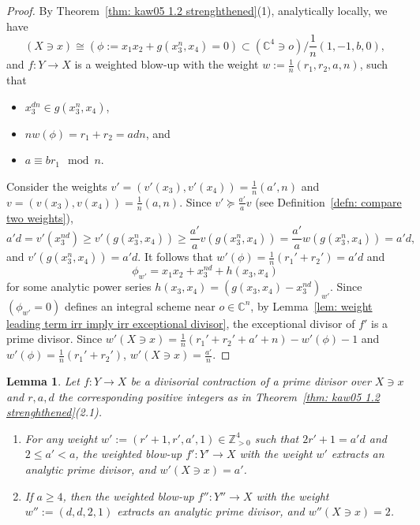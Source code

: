 \documentclass[11pt]{amsart}
\numberwithin{equation}{section}
\newcommand{\Cc}{\mathbb{C}}
\newtheorem{lem}[thm]{Lemma}
\theoremstyle{definition}
\theoremstyle{definition}
\begin{document}
\begin{proof}
By Theorem~\ref{thm: kaw05 1.2 strenghthened}(1), analytically locally, we have $$(X\ni x)\cong (\phi:= x_1x_2+g(x_3^n,x_4)=0)\subset (\mathbb C^4\ni o)/\frac{1}{n}(1,-1,b,0),$$ and $f: Y\to X$ is a weighted blow-up with the weight $w:=\frac{1}{n}(r_1,r_2,a,n)$, such that 
\begin{itemize}
        \item $x_3^{dn}\in g(x_3^n,x_4)$,
        \item $nw(\phi)=r_1+r_2=adn$, and
        \item $a\equiv br_1\mod n$.
\end{itemize}


    Consider the weights $v'=(v'(x_3),v'(x_4))=\frac{1}{n}(a',n)$ and $v=(v(x_3),v(x_4))=\frac{1}{n}(a,n)$. Since $v'\succeq \frac{a'}{a}v$ (see Definition~\ref{defn: compare two weights}), $$a'd=v'(x_3^{nd})\geq v'(g(x_3^n,x_4))\geq \frac{a'}{a}v(g(x_3^n,x_4))=\frac{a'}{a}w(g(x_3^n,x_4))=a'd,$$ and $v'(g(x_3^n,x_4))=a'd$. It follows that $w'(\phi)=\frac{1}{n}(r_1'+r_2')=a'd$ and $$\phi_{w'}=x_1x_2+x_3^{nd}+h(x_3,x_4)$$ for some analytic power series $h(x_3,x_4)=(g(x_3,x_4)-x_3^{nd})_{w'}$. Since $(\phi_{w'}=0)$ defines an integral scheme near $o\in \Cc^n$, by Lemma~\ref{lem: weight leading term irr imply irr exceptional divisor}, the exceptional divisor of $f'$ is a prime divisor. Since $w'(X\ni x)=\frac{1}{n}(r_1'+r_2'+a'+n)-w'(\phi)-1$ and $w'(\phi)=\frac{1}{n}(r_1'+r_2')$, $w'(X\ni x)=\frac{a'}{n}$.
\end{proof}


\begin{lem}\label{lem: cD irreducible case 1}
Let $f: Y\to X$ be a divisorial contraction of a prime divisor over $X\ni x$ and $r,a,d$ the corresponding positive integers as in Theorem~\ref{thm: kaw05 1.2 strenghthened}(2.1).
\begin{enumerate}
    \item For any weight $w':=(r'+1,r',a',1)\in\mathbb Z_{>0}^4$ such that $2r'+1=a'd$ and $2\leq a'<a$, the weighted blow-up $f':Y'\to X$ with the weight $w'$ extracts an analytic prime divisor, and $w'(X\ni x)=a'$.
    \item If $a\geq 4$, then the weighted blow-up $f'':Y''\to X$ with the weight $w'':=(d,d,2,1)$ extracts an analytic prime divisor, and $w''(X\ni x)=2$. 
\end{enumerate}
\end{lem}
\end{document}

